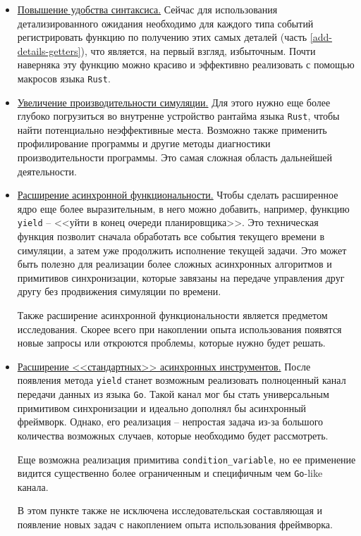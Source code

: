 \begin{itemize}
    \item \underline{Повышение удобства синтаксиса.} Сейчас для использования детализированного ожидания необходимо для каждого типа событий регистрировать функцию по получению этих самых деталей (часть \ref{add-details-getters}), что является, на первый взгляд, избыточным. Почти наверняка эту функцию можно красиво и эффективно реализовать с помощью макросов языка \texttt{Rust}.
    \item \underline{Увеличение производительности симуляции.} Для этого нужно еще более глубоко погрузиться во внутренне устройство рантайма языка \texttt{Rust}, чтобы найти потенциально неэффективные места. Возможно также применить профилирование программы и другие методы диагностики производительности программы. Это самая сложная область дальнейшей деятельности. 
    \item \underline{Расширение асинхронной функциональности.} Чтобы сделать расширенное ядро еще более выразительным, в него можно добавить, например, функцию \texttt{yield} -- <<уйти в конец очереди планировщика>>. Это техническая функция позволит сначала обработать все события текущего времени в симуляции, а затем уже продолжить исполнение текущей задачи. Это может быть полезно для реализации более сложных асинхронных алгоритмов и примитивов синхронизации, которые завязаны на передаче управления друг другу без продвижения симуляции по времени. 
    
    Также расширение асинхронной функциональности является предметом исследования. Скорее всего при накоплении опыта использования появятся новые запросы или откроются проблемы, которые нужно будет решать.
    \item \underline{Расширение <<стандартных>> асинхронных инструментов.} После появления метода \texttt{yield} станет возможным реализовать полноценный канал передачи данных из языка \texttt{Go}. Такой канал мог бы стать универсальным примитивом синхронизации и  идеально дополнял бы асинхронный фреймворк. Однако, его реализация -- непростая задача из-за большого количества возможных случаев, которые необходимо будет рассмотреть.  
    
    Еще возможна реализация примитива \texttt{condition\_variable}, но ее применение видится существенно более ограниченным и специфичным чем \texttt{Go}-like канала.

    В этом пункте также не исключена исследовательская составляющая и появление новых задач с накоплением опыта использования фреймворка.
\end{itemize}


